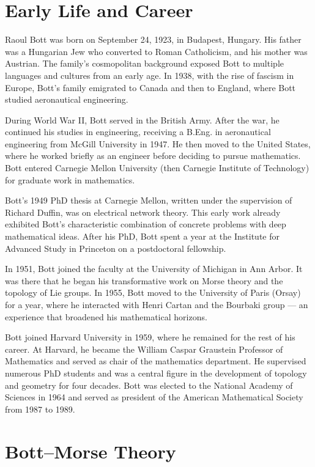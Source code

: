 \section{Early Life and Career}

Raoul Bott was born on September 24, 1923, in Budapest, Hungary. His father was a Hungarian Jew who converted to Roman Catholicism, and his mother was Austrian. The family's cosmopolitan background exposed Bott to multiple languages and cultures from an early age. In 1938, with the rise of fascism in Europe, Bott's family emigrated to Canada and then to England, where Bott studied aeronautical engineering.

During World War II, Bott served in the British Army. After the war, he continued his studies in engineering, receiving a B.Eng. in aeronautical engineering from McGill University in 1947. He then moved to the United States, where he worked briefly as an engineer before deciding to pursue mathematics. Bott entered Carnegie Mellon University (then Carnegie Institute of Technology) for graduate work in mathematics.

Bott's 1949 PhD thesis at Carnegie Mellon, written under the supervision of Richard Duffin, was on electrical network theory. This early work already exhibited Bott's characteristic combination of concrete problems with deep mathematical ideas. After his PhD, Bott spent a year at the Institute for Advanced Study in Princeton on a postdoctoral fellowship.

In 1951, Bott joined the faculty at the University of Michigan in Ann Arbor. It was there that he began his transformative work on Morse theory and the topology of Lie groups. In 1955, Bott moved to the University of Paris (Orsay) for a year, where he interacted with Henri Cartan and the Bourbaki group — an experience that broadened his mathematical horizons.

Bott joined Harvard University in 1959, where he remained for the rest of his career. At Harvard, he became the William Caspar Graustein Professor of Mathematics and served as chair of the mathematics department. He supervised numerous PhD students and was a central figure in the development of topology and geometry for four decades. Bott was elected to the National Academy of Sciences in 1964 and served as president of the American Mathematical Society from 1987 to 1989.

\section{Bott--Morse Theory}

